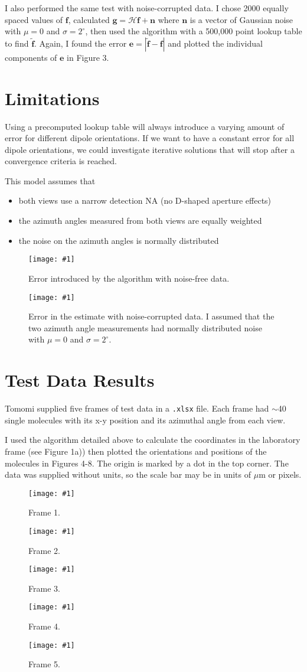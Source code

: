 \documentclass[11pt]{article}
\providecommand{\mb}[1]{\mathbf{#1}}
\providecommand{\fig}[4]{
\begin{figure}[h]
 \captionsetup{width=1.0\linewidth}
 \centering
 \texttt{[image: \#1]}
 \caption{#3}
 \label{fig:#4}
\end{figure}
}
\begin{document}
I also performed the same test with noise-corrupted data. I chose 2000 equally
spaced values of $\mb{f}$, calculated $\mb{g} = \mathcal{H}\mb{f} + \mb{n}$
where $\mb{n}$ is a vector of Gaussian noise with $\mu = 0$ and
$\sigma = 2^\circ$, then used the algorithm with a 500,000 point lookup table to
find $\tilde{\mb{f}}$. Again, I found the error
$\mb{e} = |\tilde{\mb{f}} - \mb{f}|$ and plotted the individual components of
$\mb{e}$ in Figure 3.


\section{Limitations}
Using a precomputed lookup table will always introduce a varying amount of error
for different dipole orientations. If we want to have a constant error for all
dipole orientations, we could investigate iterative solutions that will stop
after a convergence criteria is reached.
\pagebreak

This model assumes that
\begin{itemize}[nosep]
\item both views use a narrow detection NA (no D-shaped aperture effects)
\item the azimuth angles measured from both views are equally weighted
\item the noise on the azimuth angles is normally distributed
\end{itemize}

\fig{../figures/recon-error.pdf}{.9}{Error introduced by the algorithm with
  noise-free data.}{results}

\fig{../figures/recon-error-gauss.pdf}{.9}{Error in the estimate with
  noise-corrupted data. I assumed that the two azimuth angle measurements had normally distributed noise with $\mu = 0$ and $\sigma = 2^{\circ}$.}{results}
\pagebreak

\section{Test Data Results}
Tomomi supplied five frames of test data in a \texttt{.xlsx} file. Each frame
had $\sim$40 single molecules with its x-y position and its azimuthal angle from
each view.

I used the algorithm detailed above to calculate the coordinates in the
laboratory frame (see Figure 1a)) then plotted the orientations and positions of
the molecules in Figures 4-8. The origin is marked by a dot in the top corner. The
data was supplied without units, so the scale bar may be in units of $\mu$m or
pixels.

\fig{../test-analysis/output/frame01.pdf}{.4}{Frame 1.}{results}
\fig{../test-analysis/output/frame02.pdf}{.4}{Frame 2.}{results}
\fig{../test-analysis/output/frame03.pdf}{.4}{Frame 3.}{results}
\fig{../test-analysis/output/frame04.pdf}{.4}{Frame 4.}{results}
\fig{../test-analysis/output/frame05.pdf}{.4}{Frame 5.}{results}
\end{document}
